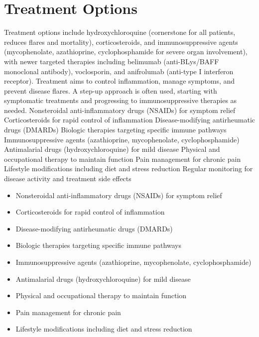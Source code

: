 \section{Treatment Options}
Treatment options include hydroxychloroquine (cornerstone for all patients, reduces flares and mortality), corticosteroids, and immunosuppressive agents (mycophenolate, azathioprine, cyclophosphamide for severe organ involvement), with newer targeted therapies including belimumab (anti-BLys/BAFF monoclonal antibody), voclosporin, and anifrolumab (anti-type I interferon receptor). Treatment aims to control inflammation, manage symptoms, and prevent disease flares. A step-up approach is often used, starting with symptomatic treatments and progressing to immunosuppressive therapies as needed. Nonsteroidal anti-inflammatory drugs (NSAIDs) for symptom relief Corticosteroids for rapid control of inflammation Disease-modifying antirheumatic drugs (DMARDs) Biologic therapies targeting specific immune pathways Immunosuppressive agents (azathioprine, mycophenolate, cyclophosphamide) Antimalarial drugs (hydroxychloroquine) for mild disease Physical and occupational therapy to maintain function Pain management for chronic pain Lifestyle modifications including diet and stress reduction Regular monitoring for disease activity and treatment side effects

\begin{itemize}[noitemsep]
  \item Nonsteroidal anti-inflammatory drugs (NSAIDs) for symptom relief
  \item Corticosteroids for rapid control of inflammation
  \item Disease-modifying antirheumatic drugs (DMARDs)
  \item Biologic therapies targeting specific immune pathways
  \item Immunosuppressive agents (azathioprine, mycophenolate, cyclophosphamide)
  \item Antimalarial drugs (hydroxychloroquine) for mild disease
  \item Physical and occupational therapy to maintain function
  \item Pain management for chronic pain
  \item Lifestyle modifications including diet and stress reduction
\end{itemize}
